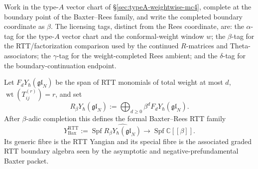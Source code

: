 \begin{theorem}
\ClaimStatusProvedHere
\label{thm:typeA-rtt-baxter-rees-obstruction-tower}
Work in the type-$A$ vector chart of
\S\ref{sec:typeA-weightwise-mc4}, complete at the boundary point of the
Baxter--Rees family, and write the completed boundary coordinate as
$\beta$. The licensing tags, distinct from the Rees coordinate, are:
the $\alpha$-tag for the type-$A$ vector chart and the conformal-weight
window $w$; the $\beta$-tag for the RTT/factorization comparison used by
the continued $R$-matrices and Theta-associators; the $\gamma$-tag for
the weight-completed Rees ambient; and the $\delta$-tag for the
boundary-continuation endpoint.

Let $F_dY_\hbar(\mathfrak{gl}_N)$ be the span of RTT monomials of total
weight at most $d$, $\operatorname{wt}(T^{(r)}_{ij})=r$, and set
\begin{equation}
\label{eq:typeA-rtt-rees-algebra}
R_\beta Y_\hbar(\mathfrak{gl}_N)
:=
\bigoplus_{d\ge0}\beta^d F_dY_\hbar(\mathfrak{gl}_N).
\end{equation}
After $\beta$-adic completion this defines the formal Baxter--Rees RTT
family
\begin{equation}
\label{eq:typeA-rtt-baxter-rees-family}
Y_{\mathrm{Bax}}^{\mathrm{RTT}}
:=
\operatorname{Spf}\widehat{R_\beta Y_\hbar(\mathfrak{gl}_N)}
\longrightarrow
\operatorname{Spf}\mathbb C[[\beta]].
\end{equation}
Its generic fibre is the RTT Yangian and its special fibre is the
associated graded RTT boundary algebra seen by the asymptotic and
negative-prefundamental Baxter packet.


\end{theorem}
